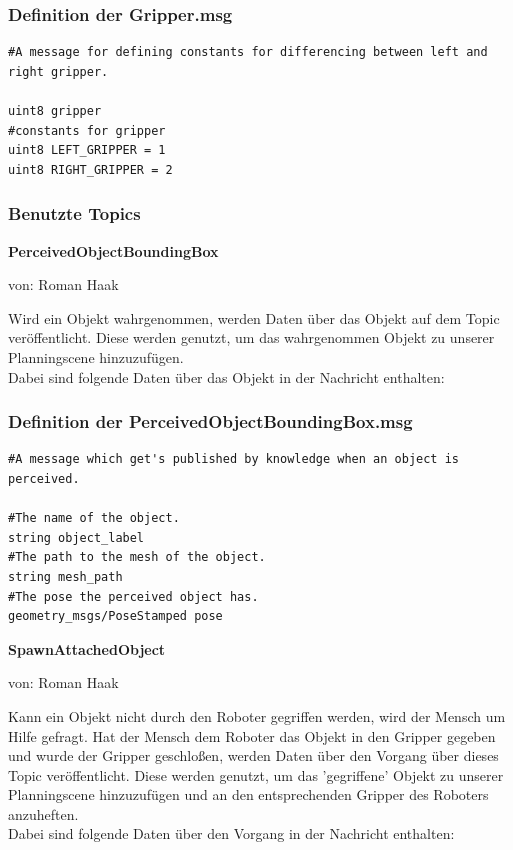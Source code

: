 \documentclass{suturo}
\makeatletter
\newcommand{\chapterauthor}[1]{%
  {\parindent0pt\vspace*{-27pt}%
  \linespread{0}\small\begin{flushright}von: #1\end{flushright}%
  \par\nobreak\vspace*{0pt}}
  \@afterheading%
}
\makeatother
\begin{document}
\subsubsection*{Definition der Gripper.msg}
\begin{verbatim}
#A message for defining constants for differencing between left and right gripper.

uint8 gripper
#constants for gripper
uint8 LEFT_GRIPPER = 1
uint8 RIGHT_GRIPPER = 2
\end{verbatim}

\subsubsection{Benutzte Topics}
\textbf{PerceivedObjectBoundingBox}
\chapterauthor{Roman Haak}

Wird ein Objekt wahrgenommen, werden Daten über das Objekt auf dem Topic veröffentlicht. Diese werden genutzt, um das wahrgenommen Objekt zu unserer Planningscene hinzuzufügen.\\ Dabei sind folgende Daten über das Objekt in der Nachricht enthalten: \\

\subsubsection*{Definition der PerceivedObjectBoundingBox.msg}
\begin{verbatim}
#A message which get's published by knowledge when an object is perceived.

#The name of the object.
string object_label
#The path to the mesh of the object.
string mesh_path
#The pose the perceived object has.
geometry_msgs/PoseStamped pose
\end{verbatim}


\textbf{SpawnAttachedObject}
\chapterauthor{Roman Haak}

Kann ein Objekt nicht durch den Roboter gegriffen werden, wird der Mensch um Hilfe gefragt. Hat der Mensch dem Roboter das Objekt in den Gripper gegeben und wurde der Gripper geschloßen, werden Daten über den Vorgang über dieses Topic veröffentlicht. Diese werden genutzt, um das 'gegriffene' Objekt zu unserer Planningscene hinzuzufügen und an den entsprechenden Gripper des Roboters anzuheften.\\ Dabei sind folgende Daten über den Vorgang in der Nachricht enthalten: \\
\end{document}
